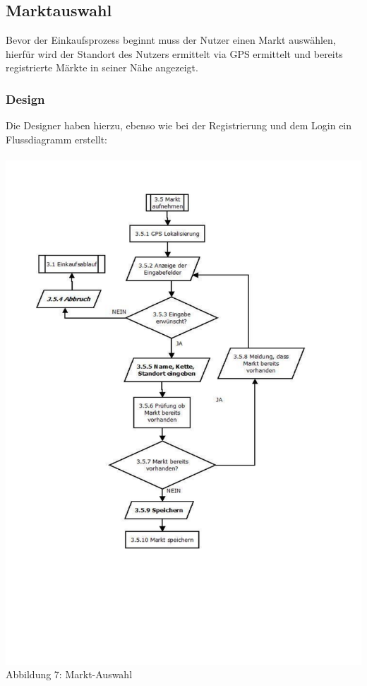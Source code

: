 \documentclass[12pt,a4paper]{article}
\begin{document}
\subsection{Marktauswahl}
Bevor der Einkaufsprozess beginnt muss der Nutzer einen Markt auswählen, hierfür wird der Standort des Nutzers ermittelt via GPS ermittelt und bereits registrierte Märkte in seiner Nähe angezeigt. 
\subsubsection*{Design}
Die Designer haben hierzu, ebenso wie bei der Registrierung und dem Login ein Flussdiagramm erstellt: 
\\
\\
\hspace*{-10mm} 
\includegraphics[trim = 17mm 40mm 0mm 20mm, clip, scale=0.9]{Markt-Aufnahme.pdf}
\\
\footnotesize Abbildung 7: Markt-Auswahl
\normalsize
\end{document}
